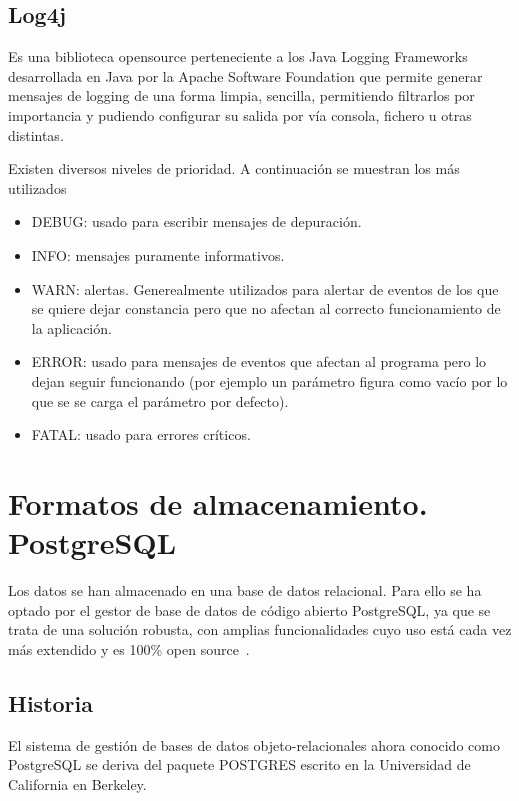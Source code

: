 {\subsection{Log4j}
 Es una biblioteca \gls{opensource} perteneciente a los Java Logging Frameworks desarrollada en Java por la Apache Software Foundation que permite generar mensajes de logging de una forma limpia, sencilla, permitiendo filtrarlos por importancia y pudiendo configurar su salida por vía consola, fichero u otras distintas.

Existen diversos niveles de prioridad. A continuación se muestran los más utilizados
\begin{itemize}
\item DEBUG: usado para escribir mensajes de depuración.
\item INFO: mensajes puramente informativos.
\item WARN: alertas. Generealmente utilizados para alertar de eventos de los que se quiere dejar constancia pero que no afectan al correcto funcionamiento de la aplicación.
\item ERROR: usado para mensajes de eventos que afectan al programa pero lo dejan seguir funcionando (por ejemplo un parámetro figura como vacío por lo que se se carga el parámetro por defecto).
\item FATAL: usado para errores críticos. 
\end{itemize}  
  
    


\section{Formatos de almacenamiento. PostgreSQL}
\label{sec:almacenamiento}

Los datos se han almacenado en una base de datos relacional. Para ello se ha optado por el gestor de base de datos de código abierto PostgreSQL, ya que se trata de una solución robusta, con amplias funcionalidades cuyo uso está cada vez más extendido y es 100\% open source~\cite{Postgresql}.


\subsection{Historia}
\label{sec:historiapsql}

El sistema de gestión de bases de datos objeto-relacionales ahora conocido como PostgreSQL se deriva del paquete POSTGRES escrito en la Universidad de California en Berkeley.

}
